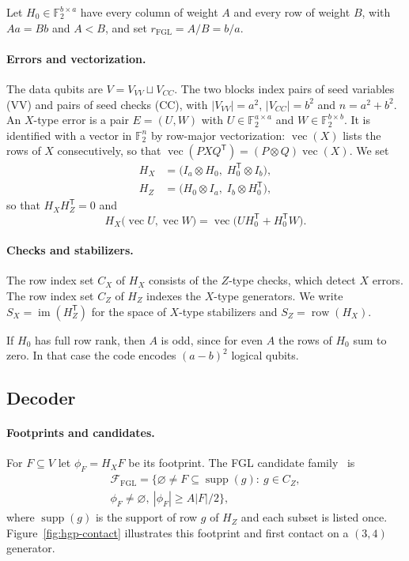 \documentclass[10pt,twocolumn]{article}
\theoremstyle{definition}
\newcommand{\Ftwo}{\mathbb{F}_2}
\DeclareMathOperator{\supp}{supp}
\DeclareMathOperator{\rowsp}{row}
\DeclareMathOperator{\im}{im}
\DeclareMathOperator{\vect}{vec}
\newcommand{\rF}{r_{\mathrm{FGL}}}
\newcommand{\FF}{\mathcal{F}}
\begin{document}
Let $H_0\in\Ftwo^{b\times a}$ have every column of weight $A$ and every row of weight $B$, with $Aa=Bb$ and $A<B$, and set $\rF=A/B=b/a$.

\paragraph{Errors and vectorization.} The data qubits are $V=V_{VV}\sqcup V_{CC}$. The two blocks
index pairs of seed variables (VV) and pairs of seed checks (CC), with $|V_{VV}|=a^2$, $|V_{CC}|=b^2$ and $n=a^2+b^2$. An $X$-type error is a pair $E=(U,W)$ with $U\in\Ftwo^{a\times a}$ and $W\in\Ftwo^{b\times b}$. It is identified with a vector in $\Ftwo^{n}$ by row-major vectorization: $\vect(X)$ lists the rows of $X$ consecutively, so that $\vect(PXQ^{\mathsf T})=(P\otimes Q)\vect(X)$. We set
\begin{equation}\label{eq:HXHZ}
\begin{aligned}
 H_X &= \bigl(I_a\otimes H_0,\;H_0^{\mathsf T}\otimes I_b\bigr),\\
 H_Z &= \bigl(H_0\otimes I_a,\;I_b\otimes H_0^{\mathsf T}\bigr),
\end{aligned}
\end{equation}
so that $H_XH_Z^{\mathsf T}=0$ and
\begin{equation}\label{eq:syndrome}
H_X\bigl(\vect U,\vect W\bigr)=\vect\bigl(UH_0^{\mathsf T}+H_0^{\mathsf T}W\bigr).
\end{equation}

\paragraph{Checks and stabilizers.} The row index set $C_X$ of $H_X$ consists of the $Z$-type checks, which detect $X$ errors. The row index set $C_Z$ of $H_Z$ indexes the $X$-type generators. We write $S_X=\im(H_Z^{\mathsf T})$ for the space of $X$-type stabilizers and $S_Z=\rowsp(H_X)$.

If $H_0$ has full row rank, then $A$ is odd, since for even $A$ the rows of $H_0$ sum to zero. In that case the code encodes $(a-b)^2$ logical qubits.

\subsection{Decoder}

\paragraph{Footprints and candidates.} For $F\subseteq V$ let $\phi_F=H_XF$ be its footprint. The FGL candidate family~\cite[Eq.~(5) and Algorithm~2]{FGL18} is
\begin{equation}\label{eq:FGLfamily}
\begin{gathered}
\FF_{\mathrm{FGL}}=\bigl\{\varnothing\neq F\subseteq\supp(g):\ g\in C_Z,\\
 \phi_F\neq\varnothing,\ |\phi_F|\ge A|F|/2\bigr\},
\end{gathered}
\end{equation}
where $\supp(g)$ is the support of row $g$ of $H_Z$ and each subset
is listed once. Figure~\ref{fig:hgp-contact} illustrates this footprint
and first contact on a $(3,4)$ generator.
\end{document}
